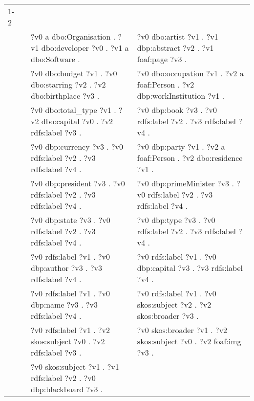 \begin{table}
{\begin{tabular}{!{\color{white}\vrule}l!{\color{white}\vrule}c@{\hs}!{\color{white}\vrule}p{11.5cm}!{\color{white}\vrule}p{11.5cm}!{\color{white}\vrule}}
			\midrule
			1-2 & \phantom{a} & \\
			 &  \phantom{a} &   ?v0 a dbo:Organisation .  ?v1 dbo:developer ?v0 .  ?v1 a dbo:Software . &  ?v0 dbo:artist ?v1 .  ?v1 dbp:abstract ?v2 .  ?v1 foaf:page ?v3 . \\
			 &  \phantom{a} &  ?v0 dbo:budget ?v1 .  ?v0 dbo:starring ?v2 .  ?v2 dbo:birthplace ?v3 . &  ?v0 dbo:occupation ?v1 .  ?v2 a foaf:Person .  ?v2 dbp:workInstitution ?v1 . \\
			 &  \phantom{a} &   ?v0 dbo:total\_type ?v1 .  ?v2 dbo:capital ?v0 .  ?v2 rdfs:label ?v3 . &  ?v0 dbp:book ?v3 .  ?v0 rdfs:label ?v2 .  ?v3 rdfs:label ?v4 . \\
			 &  \phantom{a} &  ?v0 dbp:currency ?v3 .  ?v0 rdfs:label ?v2 .  ?v3 rdfs:label ?v4 . &  ?v0 dbp:party ?v1 .  ?v2 a foaf:Person .  ?v2 dbo:residence ?v1 . \\
			 &  \phantom{a} &   ?v0 dbp:president ?v3 .  ?v0 rdfs:label ?v2 .  ?v3 rdfs:label ?v4 . &  ?v0 dbp:primeMinister ?v3 .  ?v0 rdfs:label ?v2 .  ?v3 rdfs:label ?v4 . \\
			 &  \phantom{a} &  ?v0 dbp:state ?v3 .  ?v0 rdfs:label ?v2 .  ?v3 rdfs:label ?v4 . &  ?v0 dbp:type ?v3 .  ?v0 rdfs:label ?v2 .  ?v3 rdfs:label ?v4 . \\
			 &  \phantom{a} &   ?v0 rdfs:label ?v1 .  ?v0 dbp:author ?v3 .  ?v3 rdfs:label ?v4 . &  ?v0 rdfs:label ?v1 .  ?v0 dbp:capital ?v3 .  ?v3 rdfs:label ?v4 . \\
			 &  \phantom{a} &  ?v0 rdfs:label ?v1 .  ?v0 dbp:name ?v3 .  ?v3 rdfs:label ?v4 . &  ?v0 rdfs:label ?v1 .  ?v0 skos:subject ?v2 .  ?v2 skos:broader ?v3 . \\
			 &  \phantom{a} &   ?v0 rdfs:label ?v1 .  ?v2 skos:subject ?v0 .  ?v2 rdfs:label ?v3 . &  ?v0 skos:broader ?v1 .  ?v2 skos:subject ?v0 .  ?v2 foaf:img ?v3 . \\
			 &  \phantom{a} &  ?v0 skos:subject ?v1 .  ?v1 rdfs:label ?v2 .  ?v0 dbp:blackboard ?v3 . & \\
			

\end{tabular}}
\end{table}
